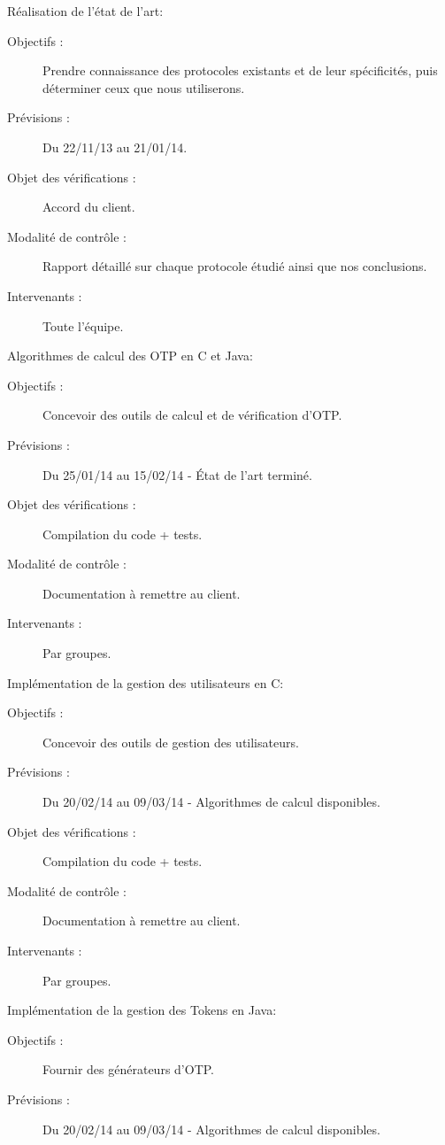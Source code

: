 \documentclass{../../res/univ-projet}
\begin{document}
\begin{description}
	\item Réalisation de l'état de l'art:
	\begin{description}
		\item[Objectifs :] Prendre connaissance des protocoles existants et de leur spécificités, puis déterminer ceux que nous utiliserons.
		\item[Prévisions :] Du 22/11/13 au 21/01/14.
		\item[Objet des vérifications :] Accord du client.
		\item[Modalité de contrôle :] Rapport détaillé sur chaque protocole étudié ainsi que nos conclusions.
		\item[Intervenants :] Toute l'équipe.
	\end{description}
	\vfill
	\item Algorithmes de calcul des OTP en C et Java:
	\begin{description}
		\item[Objectifs :] Concevoir des outils de calcul et de vérification d'OTP.
		\item[Prévisions :] Du 25/01/14 au 15/02/14 - État de l'art terminé.
		\item[Objet des vérifications :] Compilation du code + tests.
		\item[Modalité de contrôle :] Documentation à remettre au client.
		\item[Intervenants :] Par groupes.
	\end{description}
	\vfill
	\item Implémentation de la gestion des utilisateurs en C:
	\begin{description}
		\item[Objectifs :] Concevoir des outils de gestion des utilisateurs.
		\item[Prévisions :] Du 20/02/14 au 09/03/14 - Algorithmes de calcul disponibles.
		\item[Objet des vérifications :] Compilation du code + tests.
		\item[Modalité de contrôle :] Documentation à remettre au client.
		\item[Intervenants :] Par groupes.
	\end{description}
	\vfill
	\item Implémentation de la gestion des Tokens en Java:
	\begin{description}
		\item[Objectifs :] Fournir des générateurs d'OTP.
		\item[Prévisions :] Du 20/02/14 au 09/03/14 - Algorithmes de calcul disponibles.

\end{description}
\end{description}
\end{document}
